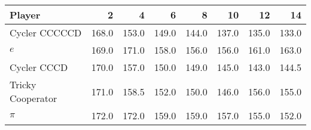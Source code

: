 \begin{tabular}{lrrrrrrr}
\toprule
            Player &      2 &      4 &      6 &      8 &     10 &     12 &     14 \\
\midrule
     Cycler CCCCCD &  168.0 &  153.0 &  149.0 &  144.0 &  137.0 &  135.0 &  133.0 \\
               $e$ &  169.0 &  171.0 &  158.0 &  156.0 &  156.0 &  161.0 &  163.0 \\
       Cycler CCCD &  170.0 &  157.0 &  150.0 &  149.0 &  145.0 &  143.0 &  144.5 \\
 Tricky Cooperator &  171.0 &  158.5 &  152.0 &  150.0 &  146.0 &  156.0 &  155.0 \\
             $\pi$ &  172.0 &  172.0 &  159.0 &  159.0 &  157.0 &  155.0 &  152.0 \\
\bottomrule
\end{tabular}
